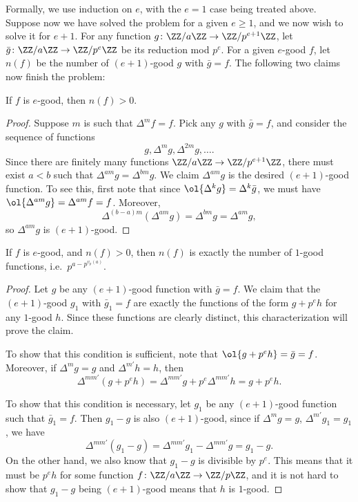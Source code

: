 \documentclass[11pt]{scrartcl}
\begin{document}
Formally, we use induction on $e$, with the $e = 1$ case being treated above.
Suppose now we have solved the problem for a given $e \geq 1$,
and we now wish to solve it for $e + 1$.
For any function $g \colon \ZZ/a\ZZ \to \ZZ/p^{e+1}\ZZ$,
let $\bar g \colon \ZZ/a\ZZ \to \ZZ/p^e\ZZ$ be its reduction mod $p^e$.
For a given $e$-good $f$, let $n(f)$ be the number of $(e+1)$-good $g$ with $\bar g = f$.
The following two claims now finish the problem:

\begin{claim*}
  If $f$ is $e$-good, then $n(f) > 0$.
\end{claim*}
\begin{proof}
  Suppose $m$ is such that $\Delta^m f = f$.
  Pick any $g$ with $\bar g = f$, and consider the sequence of functions
  \[ g, \Delta^m g, \Delta^{2m} g, \dots. \]
  Since there are finitely many functions $\ZZ/a\ZZ \to \ZZ/p^{e+1}\ZZ$,
  there must exist $a < b$ such that $\Delta^{am} g = \Delta^{bm} g$.
  We claim $\Delta^{am} g$ is the desired $(e+1)$-good function.
  To see this, first note that since $\ol{\Delta^k g} = \Delta^k \bar g$,
  we must have $\ol{\Delta^{am} g} = \Delta^{am} f = f$.
  Moreover,
  \[ \Delta^{(b-a)m} (\Delta^{am} g) = \Delta^{bm} g = \Delta^{am} g, \]
  so $\Delta^{am} g$ is $(e+1)$-good.
\end{proof}

\begin{claim*}
  If $f$ is $e$-good, and $n(f) > 0$,
  then $n(f)$ is exactly the number of $1$-good functions,
  i.e.\ $p^{a - p^{v_p(a)}}$.
\end{claim*}
\begin{proof}
  Let $g$ be any $(e+1)$-good function with $\bar g = f$.
  We claim that the $(e+1)$-good $g_1$ with $\bar g_1 = f$
  are exactly the functions of the form $g + p^e h$ for any $1$-good $h$.
  Since these functions are clearly distinct,
  this characterization will prove the claim.

  To show that this condition is sufficient,
  note that $\ol{g + p^e h} = \bar g = f$.
  Moreover, if $\Delta^m g = g$ and $\Delta^{m'} h = h$, then
  \[ \Delta^{mm'}(g + p^e h)
    = \Delta^{mm'} g + p^e \Delta^{mm'} h = g + p^e h. \]

  To show that this condition is necessary,
  let $g_1$ be any $(e+1)$-good function such that $\bar g_1 = f$.
  Then $g_1 - g$ is also $(e+1)$-good, since if $\Delta^m g = g$,
  $\Delta^{m'} g_1 = g_1$, we have
  \[ \Delta^{mm'}(g_1 - g) = \Delta^{mm'} g_1 - \Delta^{mm'} g = g_1 - g. \]
  On the other hand, we also know that $g_1 - g$ is divisible by $p^e$.
  This means that it must be $p^e h$ for some function
  $f \colon \ZZ/a\ZZ \to \ZZ/p\ZZ$, and it is not hard to show
  that $g_1 - g$ being $(e+1)$-good means that $h$ is $1$-good.
\end{proof}
\pagebreak
\end{document}
